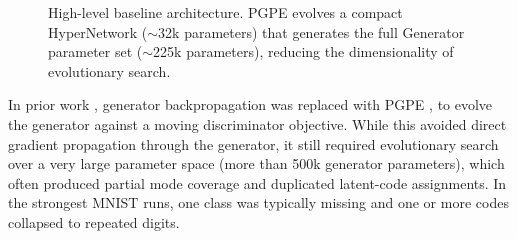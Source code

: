 \documentclass[letterpaper]{article} %
\begin{document}
\begin{figure}[t]
{
		}
		\caption{High-level baseline architecture. PGPE evolves a compact HyperNetwork ($\sim$32k parameters) that generates the full Generator parameter set ($\sim$225k parameters), reducing the dimensionality of evolutionary search.}
		\label{fig:architecture}
	\end{figure}
	
	In prior work \cite{b1}, generator backpropagation was replaced with PGPE \cite{b4}, to evolve the generator against a moving discriminator objective. While this avoided direct gradient propagation through the generator, it still required evolutionary search over a very large parameter space (more than 500k generator parameters), which often produced partial mode coverage and duplicated latent-code assignments. In the strongest MNIST runs, one class was typically missing and one or more codes collapsed to repeated digits.
	
\end{document}
